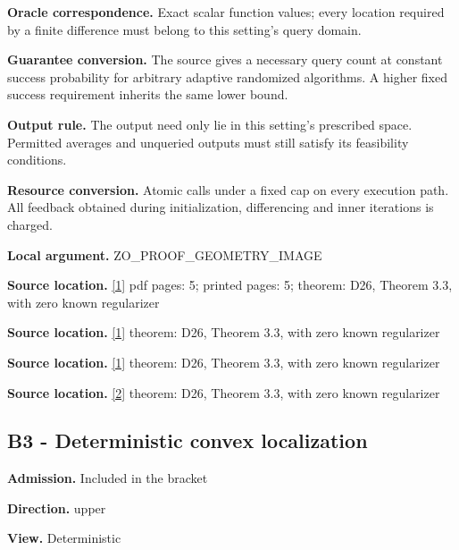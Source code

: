\documentclass[10pt,a4paper]{article}
\begin{document}
\textbf{Oracle correspondence.} Exact scalar function values; every location required by a finite difference must belong to this setting's query domain.



\textbf{Guarantee conversion.} The source gives a necessary query count at constant success probability for arbitrary adaptive randomized algorithms. A higher fixed success requirement inherits the same lower bound.



\textbf{Output rule.} The output need only lie in this setting's prescribed space. Permitted averages and unqueried outputs must still satisfy its feasibility conditions.



\textbf{Resource conversion.} Atomic calls under a fixed cap on every execution path. All feedback obtained during initialization, differencing and inner iterations is charged.



\textbf{Local argument.} ZO\_PROOF\_GEOMETRY\_IMAGE



\textbf{Source location.} \href{https://arxiv.org/html/2610.00345v1}{[1]} pdf pages: 5; printed pages: 5; theorem: D26, Theorem 3.3, with zero known regularizer



\textbf{Source location.} \href{https://arxiv.org/html/2610.00345v1}{[1]} theorem: D26, Theorem 3.3, with zero known regularizer



\textbf{Source location.} \href{https://arxiv.org/html/2610.00345v1}{[1]} theorem: D26, Theorem 3.3, with zero known regularizer



\textbf{Source location.} \href{https://arxiv.org/html/2607.16558v2}{[2]} theorem: D26, Theorem 3.3, with zero known regularizer



\subsection{B3 - Deterministic convex localization}


\textbf{Admission.} Included in the bracket



\textbf{Direction.} upper



\textbf{View.} Deterministic
\end{document}
